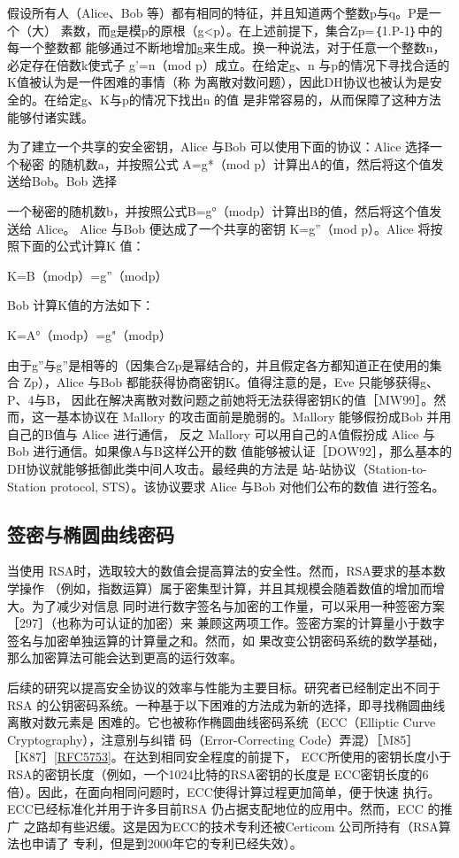 假设所有人（Alice、Bob 等）都有相同的特征，并且知道两个整数p与q。P是一个（大）
素数，而g是模p的原根（g<p）。在上述前提下，集合Zp=｛1.P-1｝中的每一个整数都
能够通过不断地增加g来生成。换一种说法，对于任意一个整数n，必定存在倍数k使式子
g'=n（mod p）成立。在给定g、n 与p的情况下寻找合适的K值被认为是一件困难的事情（称
为离散对数问题），因此DH协议也被认为是安全的。在给定g、K与p的情况下找出n 的值
是非常容易的，从而保障了这种方法能够付诸实践。

为了建立一个共享的安全密钥，Alice 与Bob 可以使用下面的协议：Alice 选择一个秘密
的随机数a，并按照公式 A=g*（mod p）计算出A的值，然后将这个值发送给Bob。Bob 选择


一个秘密的随机数b，并按照公式B=g°（modp）计算出B的值，然后将这个值发送给 Alice。
Alice 与Bob 便达成了一个共享的密钥 K=g”（mod p）。Alice 将按照下面的公式计算K 值：

K=B（modp）=g”（modp）

Bob 计算K值的方法如下：

K=A°（modp）=g"（modp）

由于g”与g”是相等的（因集合Zp是幂结合的，并且假定各方都知道正在使用的集
合 Zp），Alice 与Bob 都能获得协商密钥K。值得注意的是，Eve 只能够获得g、P、4与B，
因此在解决离散对数问题之前她将无法获得密钥K的值［MW99］。然而，这一基本协议在
Mallory 的攻击面前是脆弱的。Mallory 能够假扮成Bob 并用自己的B值与 Alice 进行通信，
反之 Mallory 可以用自己的A值假扮成 Alice 与Bob 进行通信。如果像A与B这样公开的数
值能够被认证［DOW92］，那么基本的DH协议就能够抵御此类中间人攻击。最经典的方法是
站-站协议（Station-to-Station protocol, STS）。该协议要求 Alice 与Bob 对他们公布的数值
进行签名。

\subsection{签密与椭圆曲线密码}
当使用 RSA时，选取较大的数值会提高算法的安全性。然而，RSA要求的基本数学操作
（例如，指数运算）属于密集型计算，并且其规模会随着数值的增加而增大。为了减少对信息
同时进行数字签名与加密的工作量，可以采用一种签密方案［297］（也称为可认证的加密）来
兼顾这两项工作。签密方案的计算量小于数字签名与加密单独运算的计算量之和。然而，如
果改变公钥密码系统的数学基础，那么加密算法可能会达到更高的运行效率。

后续的研究以提高安全协议的效率与性能为主要目标。研究者已经制定出不同于 RSA
的公钥密码系统。一种基于以下困难的方法成为新的选择，即寻找椭圆曲线离散对数元素是
困难的。它也被称作椭圆曲线密码系统（ECC（Elliptic Curve Cryptography），注意别与纠错
码（Error-Correcting Code）弄混）［M85］［K87］\href{https://www.rfc-editor.org/rfc/rfc5753}{[RFC5753]}。在达到相同安全程度的前提下，
ECC所使用的密钥长度小于 RSA的密钥长度（例如，一个1024比特的RSA密钥的长度是
ECC密钥长度的6倍）。因此，在面向相同问题时，ECC使得计算过程更加简单，便于快速
执行。ECC已经标准化并用于许多目前RSA 仍占据支配地位的应用中。然而，ECC 的推广
之路却有些迟缓。这是因为ECC的技术专利还被Certicom 公司所持有（RSA算法也申请了
专利，但是到2000年它的专利已经失效）。

